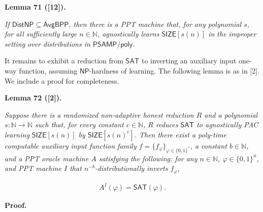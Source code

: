 

\par\medskip\noindent\textbf{
\textbf{Lemma 71}\textbf{ }([12])\textbf{.}
}\par



\emph{If ${\mathsf{Dist}}{\mathsf{NP}}\subseteq{\mathsf{Avg}}{\mathsf{BPP}}$, then there is a PPT machine that, for any polynomial $s$, for all sufficiently large $n\in\mathbb{N}$, agnostically learns ${\mathsf{SIZE}}[s(n)]$ in the improper setting over distributions in ${\mathsf{P}}{\mathsf{SAMP}}/{\mathsf{poly}}$.}\par






It remains to exhibit a reduction from ${\mathsf{SAT}}$ to inverting an auxiliary input one-way function, assuming ${\mathsf{NP}}$-hardness of learning. The following lemma is as in [2]. We include a proof for completeness.\par





\par\medskip\noindent\textbf{
\textbf{Lemma 72}\textbf{ }([2])\textbf{.}
}\par



\emph{Suppose there is a randomized non-adaptive honest reduction $R$ and a polynomial $s:\mathbb{N}\to\mathbb{N}$ such that, for every constant $c\in\mathbb{N}$, $R$ reduces ${\mathsf{SAT}}$ to agnostically PAC learning ${\mathsf{SIZE}}[s(n)]$ by ${\mathsf{SIZE}}[s(n)^{c}]$. Then there exist a poly-time computable auxiliary input function family $f=\{f_{\varphi}\}_{\varphi\in\{0,1\}^{*}}$, a constant $b\in\mathbb{N}$, and a PPT oracle machine $A$ satisfying the following: for any $n\in\mathbb{N}$, $\varphi\in\{0,1\}^{n}$, and PPT machine $I$ that $n^{-b}$-distributionally inverts $f_{\varphi}$,}\par


\[\begin{gathered}
A^{I}(\varphi)={\mathsf{SAT}}(\varphi).
\end{gathered}\]







\par\medskip\noindent\textbf{Proof.}\par




